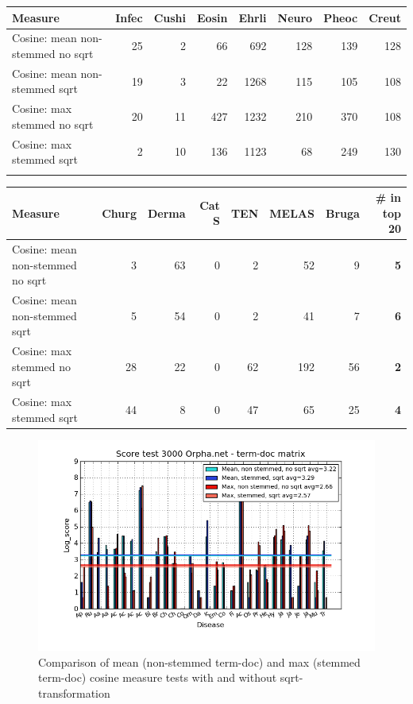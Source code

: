 \begin{table}[H]
  \label{testResult_termDoc_bmj_hist_3000_ns_mea_ns_mea_sqr_s_max_s_max_sqr}
  \begin{tiny}
    \begin{tabular}{|l|r|r|r|r|r|r|r|}
      \hline
      Measure &Infec&Cushi&Eosin&Ehrli&Neuro&Pheoc&Creut \\
      \hline
      Cosine: mean non-stemmed no sqrt &25&2&66&692&128&139&128 \\
      \hline
      Cosine: mean non-stemmed sqrt &19&3&22&1268&115&105&108 \\
      \hline
      Cosine: max stemmed no sqrt &20&11&427&1232&210&370&108 \\
      \hline
      Cosine: max stemmed sqrt &2&10&136&1123&68&249&130 \\
      \hline
      \multicolumn{8}{c}{} \\
    \end{tabular}
    \begin{tabular}{|l|r|r|r|r|r|r|r|}
      \hline
      Measure &Churg&Derma&Cat S&TEN&MELAS&Bruga& \scriptsize{\textbf{\# in top 20}} \\
      \hline
      Cosine: mean non-stemmed no sqrt &3&63&0&2&52&9 &\scriptsize{\textbf{5}} \\
      \hline
      Cosine: mean non-stemmed sqrt &5&54&0&2&41&7 &\scriptsize{\textbf{6}}\\
      \hline
      Cosine: max stemmed no sqrt &28&22&0&62&192&56 & \scriptsize{\textbf{2}} \\
      \hline
      Cosine: max stemmed sqrt &44&8&0&47&65&25 & \scriptsize{\textbf{4}} \\
      \hline
    \end{tabular}
  \end{tiny}
\end{table}

\begin{figure}[H]
  \caption{Comparison of mean (non-stemmed term-doc) and max (stemmed term-doc) cosine measure tests with and without sqrt-transformation}
  \begin{center}
    \includegraphics[width=1.2\textwidth]{barcharts/termDoc_orphan_hist_3000_ns_mea_ns_mea_sqr_s_max_s_max_sqr.png}
  \end{center}  
  \label{termDoc_orphan_hist_3000_ns_mea_ns_mea_sqr_s_max_s_max_sqr}
\end{figure}

